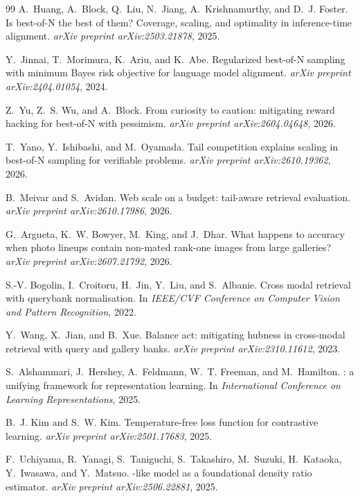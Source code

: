 \documentclass[11pt]{article}
\theoremstyle{plain}
\theoremstyle{definition}
\theoremstyle{remark}
\begin{document}
\begin{thebibliography}{99}
A.~Huang, A.~Block, Q.~Liu, N.~Jiang, A.~Krishnamurthy, and D.~J. Foster.
\newblock Is best-of-{N} the best of them? {C}overage, scaling, and
 optimality in inference-time alignment.
\newblock \emph{arXiv preprint arXiv:2503.21878}, 2025.

Y.~Jinnai, T.~Morimura, K.~Ariu, and K.~Abe.
\newblock Regularized best-of-{N} sampling with minimum {B}ayes risk objective
 for language model alignment.
\newblock \emph{arXiv preprint arXiv:2404.01054}, 2024.

Z.~Yu, Z.~S. Wu, and A.~Block.
\newblock From curiosity to caution: mitigating reward hacking for best-of-{N}
 with pessimism.
\newblock \emph{arXiv preprint arXiv:2604.04648}, 2026.

T.~Yano, Y.~Ishibashi, and M.~Oyamada.
\newblock Tail competition explains scaling in best-of-{N} sampling for
 verifiable problems.
\newblock \emph{arXiv preprint arXiv:2610.19362}, 2026.

B.~Meivar and S.~Avidan.
\newblock Web scale on a budget: tail-aware retrieval evaluation.
\newblock \emph{arXiv preprint arXiv:2610.17986}, 2026.

G.~Argueta, K.~W. Bowyer, M.~King, and J.~Dhar.
\newblock What happens to accuracy when photo lineups contain non-mated
 rank-one images from large galleries?
\newblock \emph{arXiv preprint arXiv:2607.21792}, 2026.

S.-V. Bogolin, I.~Croitoru, H.~Jin, Y.~Liu, and S.~Albanie.
\newblock Cross modal retrieval with querybank normalisation.
\newblock In \emph{IEEE/CVF Conference on Computer Vision and Pattern
 Recognition}, 2022.

Y.~Wang, X.~Jian, and B.~Xue.
\newblock Balance act: mitigating hubness in cross-modal retrieval with query
 and gallery banks.
\newblock \emph{arXiv preprint arXiv:2310.11612}, 2023.

S.~Alshammari, J.~Hershey, A.~Feldmann, W.~T. Freeman, and M.~Hamilton.
: a unifying framework for representation learning.
\newblock In \emph{International Conference on Learning Representations},
 2025.

B.~J. Kim and S.~W. Kim.
\newblock Temperature-free loss function for contrastive learning.
\newblock \emph{arXiv preprint arXiv:2501.17683}, 2025.

F.~Uchiyama, R.~Yanagi, S.~Taniguchi, S.~Takashiro, M.~Suzuki, H.~Kataoka,
 Y.~Iwasawa, and Y.~Matsuo.
-like model as a foundational density ratio estimator.
\newblock \emph{arXiv preprint arXiv:2506.22881}, 2025.

\end{thebibliography}
\end{document}
